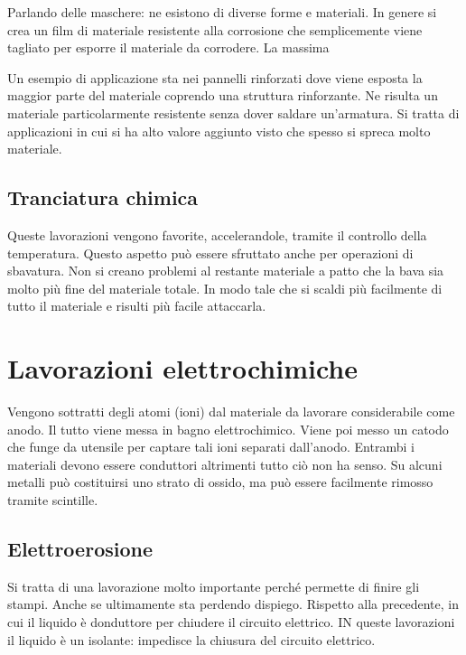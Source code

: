 Parlando delle maschere: ne esistono di diverse forme e materiali. In genere si crea un film di materiale resistente alla corrosione che semplicemente viene tagliato per esporre il materiale da corrodere.
La massima 

Un esempio di applicazione sta nei pannelli rinforzati dove viene esposta la maggior parte del materiale coprendo una struttura rinforzante. Ne risulta un materiale particolarmente resistente senza dover saldare un'armatura. Si tratta di applicazioni in cui si ha alto valore aggiunto visto che spesso si spreca molto materiale.

\subsection{Tranciatura chimica}

Queste lavorazioni vengono favorite, accelerandole, tramite il controllo della temperatura.
Questo aspetto può essere sfruttato anche per operazioni di sbavatura. Non si creano problemi al restante materiale a patto che la bava sia molto più fine del materiale totale. In modo tale che si scaldi più facilmente di tutto il materiale e risulti più facile attaccarla.

\section{Lavorazioni elettrochimiche}
Vengono sottratti degli atomi (ioni) dal materiale da lavorare considerabile come anodo. Il tutto viene messa in bagno elettrochimico. Viene poi messo un catodo che funge da utensile per captare tali ioni separati dall'anodo.
Entrambi i materiali devono essere conduttori altrimenti tutto ciò non ha senso.
Su alcuni metalli può costituirsi uno strato di ossido, ma può essere facilmente rimosso tramite scintille.

\subsection{Elettroerosione}
Si tratta di una lavorazione molto importante perché permette di finire gli stampi. Anche se ultimamente sta perdendo dispiego.
Rispetto alla precedente, in cui il liquido è donduttore per chiudere il circuito elettrico. IN queste lavorazioni il liquido è un isolante: impedisce la chiusura del circuito elettrico.

